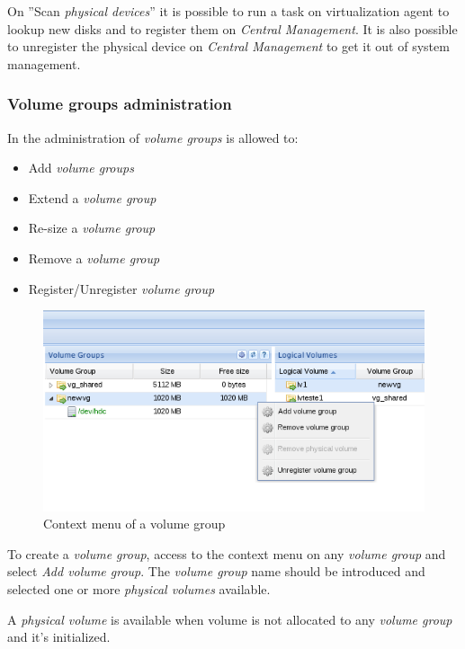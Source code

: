 On ''Scan \emph{physical devices}'' it is possible to run a task on virtualization agent to lookup new disks and to register them on \emph{Central Management}. It is also possible to unregister the physical device on \emph{Central Management} to get it out of system management.


\subsubsection{Volume groups administration}
In the administration of \emph{volume groups} is allowed to:
\begin{itemize}
	\item Add \emph{volume groups}
	\item Extend a \emph{volume group}
	\item Re-size a \emph{volume group}
	\item Remove a \emph{volume group}
	\item Register/Unregister \emph{volume group}
\end{itemize}

\begin{figure}[H]
        \begin{center}
        \includegraphics[scale=0.45]{screenshots/node_storage_vg_ctx.png}
        \caption{Context menu of a volume group}
        \label{fig:storage_vg_ctx}
        \end{center}
\end{figure}

To create a \emph{volume group}, access to the context menu on any \emph{volume group} and select \emph{Add volume group}.
The \emph{volume group} name should be introduced and selected one or more \emph{physical volumes} available.

A \emph{physical volume} is available when volume is not allocated to any \emph{volume group} and it's initialized.

